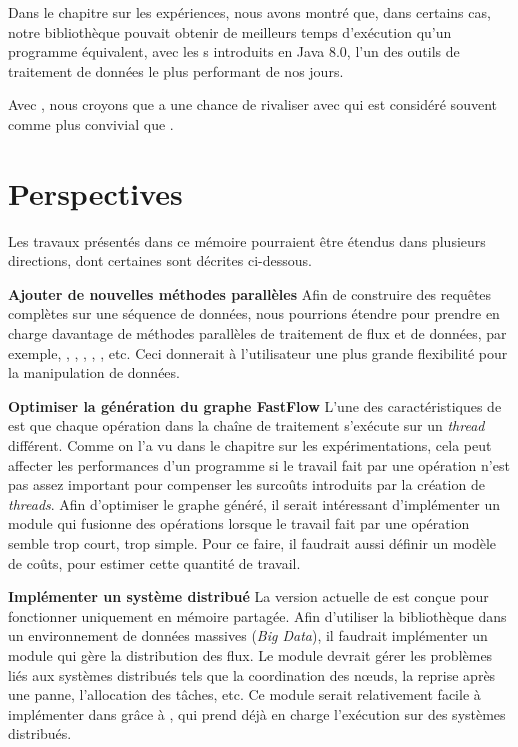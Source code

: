 \begin{conclusion}
Dans le chapitre sur les exp\'eriences, nous avons montr\'e que, dans certains cas, notre bibliothèque pouvait obtenir de meilleurs temps d'ex\'ecution qu'un programme  \'equivalent, avec les s introduits en Java 8.0, l'un des outils de traitement de donn\'ees le plus performant de nos jours.

Avec , nous croyons que  a une chance de rivaliser avec  qui est consid\'er\'e souvent comme plus convivial que . 


\section*{\textbf{Perspectives}}

Les travaux pr\'esent\'es dans ce m\'emoire pourraient \^etre \'etendus dans plusieurs directions, dont certaines sont d\'ecrites ci-dessous.

\textbf{Ajouter de nouvelles m\'ethodes parall\`eles} Afin de construire des requ\^etes compl\`etes sur une s\'equence de donn\'ees, nous pourrions \'etendre  pour prendre en charge davantage de m\'ethodes parall\`eles de traitement de flux et de donn\'ees, par exemple, , , , , , etc. Ceci donnerait \`a l'utilisateur une plus grande flexibilit\'e pour la manipulation de donn\'ees.

\textbf{Optimiser la génération du graphe FastFlow} L'une des caract\'eristiques de  est que chaque op\'eration dans la cha\^ine de traitement s'ex\'ecute sur un \emph{thread} diff\'erent. Comme on l'a vu dans le chapitre sur les expérimentations, cela peut affecter les performances d'un programme si le travail fait par une op\'eration n'est pas assez important pour compenser les surco\^uts introduits par la cr\'eation de \emph{threads}. Afin d'optimiser le graphe généré, il serait intéressant d'impl\'ementer un module qui fusionne des op\'erations lorsque le travail fait par une op\'eration semble trop court, trop simple. Pour ce faire, il faudrait aussi définir un modèle de coûts, pour estimer cette quantité de travail.

\textbf{Impl\'ementer un syst\`eme distribu\'e} La version actuelle de  est con\c{c}ue pour fonctionner uniquement en m\'emoire partag\'ee. Afin d'utiliser la bibliothèque dans un environnement de donn\'ees massives (\emph{Big Data}), il faudrait impl\'ementer un module qui g\`ere la distribution des flux. Le module devrait g\'erer les probl\`emes li\'es aux syst\`emes distribu\'es tels que la coordination des nœuds, la reprise apr\`es une panne, l'allocation des t\^aches, etc. Ce module serait relativement facile \`a impl\'ementer dans  gr\^ace \`a , qui prend d\'ej\`a en charge l'ex\'ecution sur des syst\`emes distribu\'es.


\end{conclusion}




